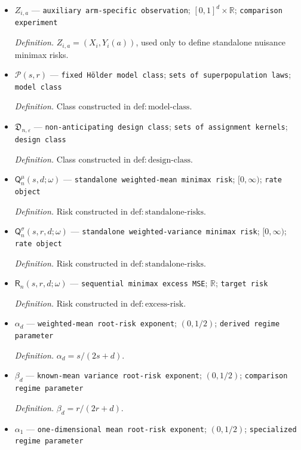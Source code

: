 \documentclass{article}
\begin{document}
\begin{itemize}
  \item \(Z_{i,a}\) --- \texttt{auxiliary arm-\allowbreak{}specific observation}; \([0,1]^d\times\mathbb R\); \texttt{comparison experiment}
  \par\smallskip\noindent\emph{Definition.} \(Z_{i,a}=(X_i,Y_i(a))\), used only to define standalone nuisance minimax risks.
  \item \(\mathcal P(s,r)\) --- \texttt{fixed Hölder model class}; \texttt{sets of superpopulation laws}; \texttt{model class}
  \par\smallskip\noindent\emph{Definition.} Class constructed in \(\mathrm{def{:}model\text{-}class}\).
  \item \(\mathfrak D_{n,\varepsilon}\) --- \texttt{non-\allowbreak{}anticipating design class}; \texttt{sets of assignment kernels}; \texttt{design class}
  \par\smallskip\noindent\emph{Definition.} Class constructed in \(\mathrm{def{:}design\text{-}class}\).
  \item \(\mathsf Q_n^{\mu}(s,d;\omega)\) --- \texttt{standalone weighted-\allowbreak{}mean minimax risk}; \([0,\infty)\); \texttt{rate object}
  \par\smallskip\noindent\emph{Definition.} Risk constructed in \(\mathrm{def{:}standalone\text{-}risks}\).
  \item \(\mathsf Q_n^{\sigma}(s,r,d;\omega)\) --- \texttt{standalone weighted-\allowbreak{}variance minimax risk}; \([0,\infty)\); \texttt{rate object}
  \par\smallskip\noindent\emph{Definition.} Risk constructed in \(\mathrm{def{:}standalone\text{-}risks}\).
  \item \(\mathsf R_n(s,r,d;\omega)\) --- \texttt{sequential minimax excess MSE}; \(\mathbb R\); \texttt{target risk}
  \par\smallskip\noindent\emph{Definition.} Risk constructed in \(\mathrm{def{:}excess\text{-}risk}\).
  \item \(\alpha_d\) --- \texttt{weighted-\allowbreak{}mean root-\allowbreak{}risk exponent}; \((0,1/2)\); \texttt{derived regime parameter}
  \par\smallskip\noindent\emph{Definition.} \(\alpha_d=s/(2s+d)\).
  \item \(\beta_d\) --- \texttt{known-\allowbreak{}mean variance root-\allowbreak{}risk exponent}; \((0,1/2)\); \texttt{comparison regime parameter}
  \par\smallskip\noindent\emph{Definition.} \(\beta_d=r/(2r+d)\).
  \item \(\alpha_1\) --- \texttt{one-\allowbreak{}dimensional mean root-\allowbreak{}risk exponent}; \((0,1/2)\); \texttt{specialized regime parameter}

\end{itemize}
\end{document}
